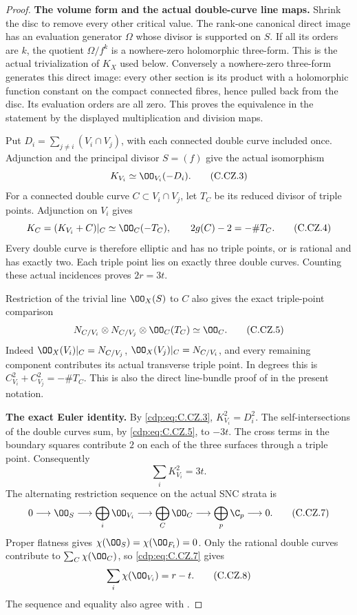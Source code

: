 \begin{proof}
\par\medskip\noindent\textbf{The volume form and the actual double-curve line maps.}
Shrink the disc to remove every other critical value.
The rank-one canonical direct image has an evaluation
generator $\Omega$ whose divisor is supported on $S$.
If all its orders are $k$, the quotient
$\Omega/f^k$ is a nowhere-zero holomorphic three-form.
This is the actual trivialization of $K_X$ used below.
Conversely a nowhere-zero three-form generates this
direct image: every other section is its product with
a holomorphic function constant on the compact connected
fibres, hence pulled back from the disc. Its evaluation
orders are all zero. This proves the equivalence in the
statement by the displayed multiplication and division maps.

Put $D_i=\sum_{j\ne i}(V_i\cap V_j)$, with each connected
double curve included once. Adjunction and the principal
divisor $S=(f)$ give the actual isomorphism
\[
                           K_{V_i}\simeq\OO_{V_i}(-D_i).
\tag{C.CZ.3}\label{cdp:eq:C.CZ.3}
\]
For a connected double curve $C\subset V_i\cap V_j$,
let $T_C$ be its reduced divisor of triple points.
Adjunction on $V_i$ gives
\[
             K_C=(K_{V_i}+C)|_C\simeq\OO_C(-T_C),
             \qquad 2g(C)-2=-\#T_C.
\tag{C.CZ.4}\label{cdp:eq:C.CZ.4}
\]
Every double curve is therefore elliptic and has no
triple points, or is rational and has exactly two.
Each triple point lies on exactly three double curves.
Counting these actual incidences proves $2r=3t$.

Restriction of the trivial line $\OO_X(S)$ to $C$
also gives the exact triple-point comparison
\[
 N_{C/V_i}\otimes N_{C/V_j}\otimes\OO_C(T_C)
                                  \simeq\OO_C.
\tag{C.CZ.5}\label{cdp:eq:C.CZ.5}
\]
Indeed $\OO_X(V_i)|_C=N_{C/V_j}$,
$\OO_X(V_j)|_C=N_{C/V_i}$, and every remaining
component contributes its actual transverse triple
point. In degrees this is
$C_{V_i}^2+C_{V_j}^2=-\#T_C$.
This is also the direct line-bundle proof of
\cite[Lemma 2.1]{Kulikov1977} in the present notation.

\par\medskip\noindent\textbf{The exact Euler identity.}
By \eqref{cdp:eq:C.CZ.3}, $K_{V_i}^2=D_i^2$.
The self-intersections of the double curves sum,
by \eqref{cdp:eq:C.CZ.5}, to $-3t$. The cross terms in the
boundary squares contribute $2$ on each of the
three surfaces through a triple point. Consequently
\[
                         \sum_iK_{V_i}^2=3t.
\tag{C.CZ.6}\label{cdp:eq:C.CZ.6}
\]
The alternating restriction sequence on the actual
SNC strata is
\[
 0\longrightarrow\OO_S\longrightarrow\bigoplus_i\OO_{V_i}
  \longrightarrow\bigoplus_C\OO_C
  \longrightarrow\bigoplus_p\C_p\longrightarrow0.
\tag{C.CZ.7}\label{cdp:eq:C.CZ.7}
\]
Proper flatness gives $\chi(\OO_S)=\chi(\OO_{F_t})=0$.
Only the rational double curves contribute to
$\sum_C\chi(\OO_C)$, so \eqref{cdp:eq:C.CZ.7} gives
\[
                         \sum_i\chi(\OO_{V_i})=r-t.
\tag{C.CZ.8}\label{cdp:eq:C.CZ.8}
\]
The sequence and equality also agree with
\cite[Lemma 2.2]{Kulikov1977}.


\end{proof}

